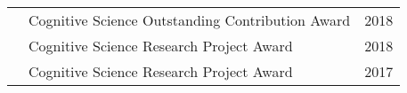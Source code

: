 \documentclass[11pt]{cooperCV_v1/cooperCV} %
\begin{document}
\begin{minipage}{\textwidth}
\begin{tabular}{ p{} %
                 p{} 
                 p{}}
  \small\textcolor{gray}{{\emph{  }}} & Cognitive Science Outstanding Contribution Award & {\hfill \small{2018}}\\
  
  \small\textcolor{gray}{{\emph{  }}} & Cognitive Science Research Project Award & {\hfill \small{2018}}\\
  
  \small\textcolor{gray}{{\emph{  }}} & Cognitive Science Research Project Award & {\hfill \small{2017}}\\
  
\end{tabular}



\end{minipage}





%


\selectfont
\end{document}
